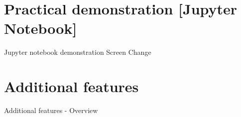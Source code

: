 \documentclass[11pt]{beamer}
\begin{document}
\section{Practical demonstration [Jupyter Notebook]}

\begin{frame}{Jupyter notebook demonstration}
    Screen Change
\end{frame}

\section{Additional features}

\begin{frame}{Additional features - Overview}
\end{frame}
\end{document}
